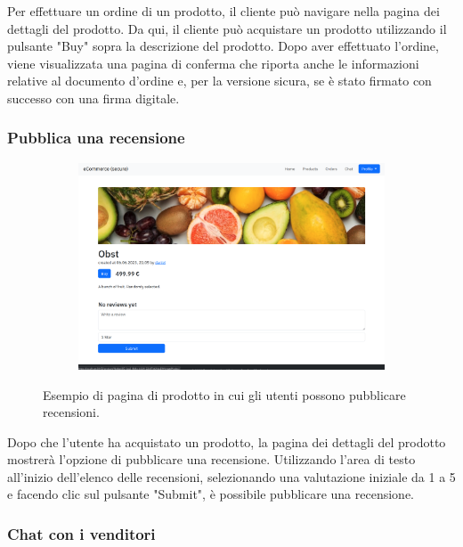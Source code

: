 \documentclass[conference,onecolumn,a4paper]{IEEEtran}
\begin{document}
Per effettuare un ordine di un prodotto, il cliente può navigare nella pagina dei dettagli del prodotto. Da qui, il cliente può acquistare un prodotto utilizzando il pulsante "Buy" sopra la descrizione del prodotto. Dopo aver effettuato l'ordine, viene visualizzata una pagina di conferma che riporta anche le informazioni relative al documento d'ordine e, per la versione sicura, se è stato firmato con successo con una firma digitale.

\subsubsection{Pubblica una recensione}

\begin{figure}[H]
    \centering
    \begin{subfigure}[b]{0.4\linewidth}
        \includegraphics[width=\linewidth]{resources/product-customer.png}
    \end{subfigure}
    \caption{Esempio di pagina di prodotto in cui gli utenti possono pubblicare recensioni.}
\end{figure}

Dopo che l'utente ha acquistato un prodotto, la pagina dei dettagli del prodotto mostrerà l'opzione di pubblicare una recensione. Utilizzando l'area di testo all'inizio dell'elenco delle recensioni, selezionando una valutazione iniziale da 1 a 5 e facendo clic sul pulsante "Submit", è possibile pubblicare una recensione.

\subsubsection{Chat con i venditori}
\end{document}
